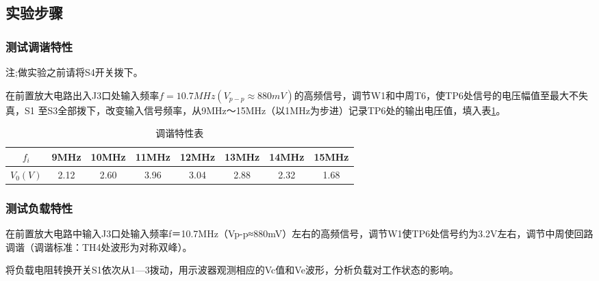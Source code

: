 \documentclass[12pt]{article}%
\numberwithin{equation}{section}
\begin{document}
\subsection{实验步骤}
\subsubsection{测试调谐特性}
注;做实验之前请将S4开关拨下。\par
在前置放大电路出入J3口处输入频率$f=10.7MHz(V_{p-p}\approx880mV)$的高频信号，调节W1和中周T6，使TP6处信号的电压幅值至最大不失真，S1 至S3全部拨下，改变输入信号频率，从9MHz～15MHz（以1MHz为步进）记录TP6处的输出电压值，填入表\ref{tab:shuangfeng}。
\begin{table}[htbp]
\centering
\caption{调谐特性表}\label{tab:shuangfeng}
\begin{tabular}{|c|c|c|c|c|c|c|c|}
\hline
$f_i$    & 9MHz & 10MHz & 11MHz & 12MHz & 13MHz & 14MHz & 15MHz \\\hline
$V_0(V)$ & 2.12 & 2.60  & 3.96  & 3.04  & 2.88  & 2.32  & 1.68 \\\hline
\end{tabular}
\end{table}
\subsubsection{测试负载特性}
在前置放大电路中输入J3口处输入频率f＝10.7MHz（Vp-p≈880mV）左右的高频信号，调节W1使TP6处信号约为3.2V左右，调节中周使回路调谐（调谐标准：TH4处波形为对称双峰）。\par
将负载电阻转换开关S1依次从1—3拨动，用示波器观测相应的Vc值和Ve波形，分析负载对工作状态的影响。
\end{document}
